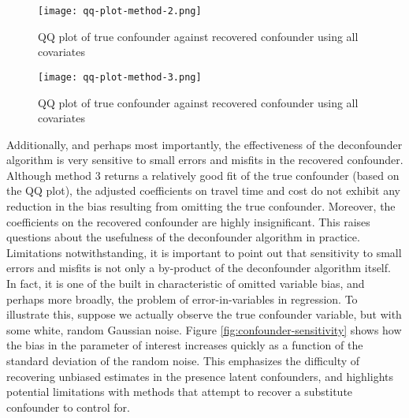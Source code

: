\begin{figure}
   \centering
   \texttt{[image: qq-plot-method-2.png]}
   \caption{QQ plot of true confounder against recovered confounder using all covariates}
   \label{fig:qq-plot-method-2}
\end{figure}

\begin{figure}
   \centering
   \texttt{[image: qq-plot-method-3.png]}
   \caption{QQ plot of true confounder against recovered confounder using all covariates}
   \label{fig:qq-plot-method-3}
\end{figure}



Additionally, and perhaps most importantly, the effectiveness of the
deconfounder algorithm is very sensitive to small errors and misfits in the
recovered confounder. Although method 3 returns a relatively good fit of the
true confounder (based on the QQ plot), the adjusted coefficients on travel
time and cost do not exhibit any reduction in the bias resulting from
omitting the true confounder. Moreover, the coefficients on the recovered
confounder are highly insignificant. This raises questions about the
usefulness of the deconfounder algorithm in practice. Limitations notwithstanding, it is
important to point out that sensitivity to small errors and misfits is not only a by-product of the deconfounder
algorithm itself. In fact, it is one of the built in characteristic of omitted
variable bias, and perhaps more broadly, the problem of error-in-variables in
regression. To illustrate this, suppose we actually observe the true
confounder variable, but with some white, random Gaussian noise. Figure \ref{fig:confounder-sensitivity}
shows how the bias in the parameter of interest increases quickly as a
function of the standard deviation of the random noise. This emphasizes the
difficulty of recovering unbiased estimates in the presence latent confounders,
and highlights potential limitations with methods that attempt to recover a
substitute confounder to control for.

